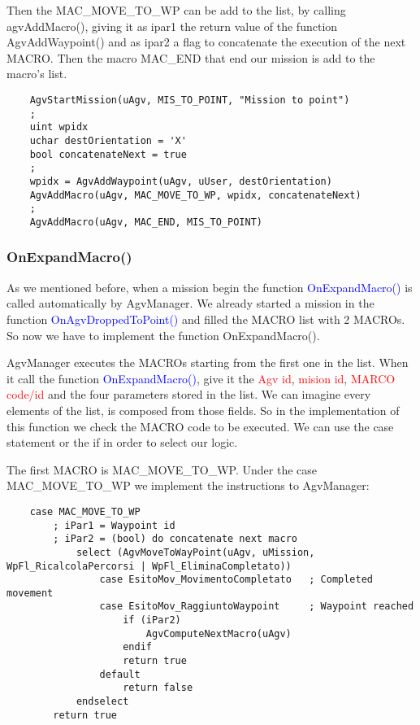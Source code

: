 Then the MAC\_MOVE\_TO\_WP can be add to the list, by calling agvAddMacro(), giving it as ipar1 the return value of the function AgvAddWaypoint() and as ipar2 a flag to concatenate the execution of the next MACRO.
Then the macro MAC\_END that end our mission is add to the macro's list.

\begin{lstlisting}
	AgvStartMission(uAgv, MIS_TO_POINT, "Mission to point")
	;
	uint wpidx
	uchar destOrientation = 'X'
	bool concatenateNext = true
	;
	wpidx = AgvAddWaypoint(uAgv, uUser, destOrientation)
	AgvAddMacro(uAgv, MAC_MOVE_TO_WP, wpidx, concatenateNext)
	;
	AgvAddMacro(uAgv, MAC_END, MIS_TO_POINT)
\end{lstlisting}	




\subsubsection{OnExpandMacro()}
As we mentioned before, when a mission begin the function \textcolor{blue}{OnExpandMacro()} is called automatically by AgvManager. We already started a mission in the function  \textcolor{blue}{OnAgvDroppedToPoint()} and filled the MACRO list with 2 MACROs. So now we have to implement the function OnExpandMacro().

AgvManager executes the MACROs starting from the first one in the list. When it call the function \textcolor{blue}{OnExpandMacro()}, give it the \textcolor{red}{Agv id}, \textcolor{red}{mision id}, \textcolor{red}{MARCO code/id} and the four parameters stored in the list. We can imagine every elements of the list, is composed from those fields. So in the implementation of this function we check the MACRO code to be executed. We can use the case statement or the if in order to select our logic.

The first MACRO is MAC\_MOVE\_TO\_WP. Under the case MAC\_MOVE\_TO\_WP we implement the instructions to AgvManager:

\begin{lstlisting}
	case MAC_MOVE_TO_WP
		; iPar1 = Waypoint id
		; iPar2 = (bool) do concatenate next macro
			select (AgvMoveToWayPoint(uAgv, uMission, WpFl_RicalcolaPercorsi | WpFl_EliminaCompletato))
				case EsitoMov_MovimentoCompletato	; Completed movement
				case EsitoMov_RaggiuntoWaypoint		; Waypoint reached
					if (iPar2)
						AgvComputeNextMacro(uAgv)
					endif
					return true
				default
					return false
			endselect
		return true
\end{lstlisting}

